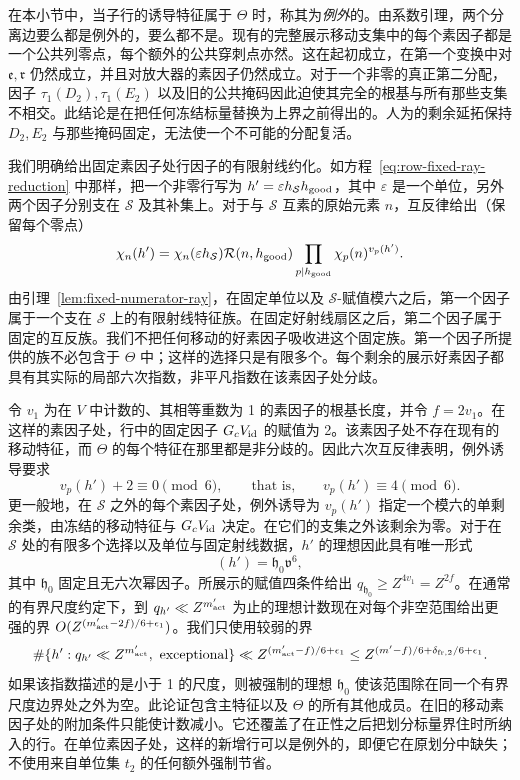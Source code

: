 在本小节中，当子行的诱导特征属于 \(\Theta\) 时，称其为\emph{例外}的。由系数引理，两个分离边要么都是例外的，要么都不是。现有的完整展示移动支集中的每个素因子都是一个公共列零点，每个额外的公共穿刺点亦然。这在起初成立，在第一个变换中对 \(\mathfrak e,\mathfrak r\) 仍然成立，并且对放大器的素因子仍然成立。对于一个非零的真正第二分配，因子 \(\tau_1(D_2),\tau_1(E_2)\) 以及旧的公共掩码因此迫使其完全的根基与所有那些支集不相交。此结论是在把任何冻结标量替换为上界之前得出的。人为的剩余延拓保持 \(D_2,E_2\) 与那些掩码固定，无法使一个不可能的分配复活。

我们明确给出固定素因子处行因子的有限射线约化。如方程~\eqref{eq:row-fixed-ray-reduction} 中那样，把一个非零行写为 \(h'=\varepsilon h_{\mathcal S}h_{\rm good}\)，其中 \(\varepsilon\) 是一个单位，另外两个因子分别支在 \(\mathcal S\) 及其补集上。对于与 \(\mathcal S\) 互素的原始元素 \(n\)，互反律给出（保留每个零点）
\[
 \chi_n(h')=\chi_n(\varepsilon h_{\mathcal S})
   \mathcal R(n,h_{\rm good})
   \prod_{p\mid h_{\rm good}}\chi_p(n)^{v_p(h')}.
\]
由引理~\ref{lem:fixed-numerator-ray}，在固定单位以及 \(\mathcal S\)-赋值模六之后，第一个因子属于一个支在 \(\mathcal S\) 上的有限射线特征族。在固定好射线扇区之后，第二个因子属于固定的互反族。我们不把任何移动的好素因子吸收进这个固定族。第一个因子所提供的族不必包含于 \(\Theta\) 中；这样的选择只是有限多个。每个剩余的展示好素因子都具有其实际的局部六次指数，非平凡指数在该素因子处分歧。

令 \(v_1\) 为在 \(V\) 中计数的、其相等重数为 1 的素因子的根基长度，并令 \(f=2v_1\)。在这样的素因子处，行中的固定因子 \(G_cV_{\rm id}\) 的赋值为 2。该素因子处不存在现有的移动特征，而 \(\Theta\) 的每个特征在那里都是非分歧的。因此六次互反律表明，例外诱导要求
\[
 v_p(h')+2\equiv0\pmod6,\qquad\text{that is,}\qquad
 v_p(h')\equiv4\pmod6.
\]
更一般地，在 \(\mathcal S\) 之外的每个素因子处，例外诱导为 \(v_p(h')\) 指定一个模六的单剩余类，由冻结的移动特征与 \(G_cV_{\rm id}\) 决定。在它们的支集之外该剩余为零。对于在 \(\mathcal S\) 处的有限多个选择以及单位与固定射线数据，\(h'\) 的理想因此具有唯一形式
\[
 (h')=\mathfrak h_0\mathfrak v^6,
\]
其中 \(\mathfrak h_0\) 固定且无六次幂因子。所展示的赋值四条件给出 \(q_{\mathfrak h_0}\ge Z^{4v_1}=Z^{2f}\)。在通常的有界尺度约定下，到 \(q_{h'}\ll Z^{m'_{\rm act}}\) 为止的理想计数现在对每个非空范围给出更强的界 \(O(Z^{(m'_{\rm act}-2f)/6+\epsilon_1})\)。我们只使用较弱的界
\begin{equation}
 \#\{h':q_{h'}\ll Z^{m'_{\rm act}},\ \text{exceptional}\}
 \ll Z^{(m'_{\rm act}-f)/6+\epsilon_1}
 \le Z^{(m'-f)/6+\delta_{{\rm fr},2}/6+\epsilon_1}.
 \label{eq:exceptional-row-count}
\end{equation}
如果该指数描述的是小于 1 的尺度，则被强制的理想 \(\mathfrak h_0\) 使该范围除在同一个有界尺度边界处之外为空。此论证包含主特征以及 \(\Theta\) 的所有其他成员。在旧的移动素因子处的附加条件只能使计数减小。它还覆盖了在正性之后把划分标量界住时所纳入的行。在单位素因子处，这样的新增行可以是例外的，即便它在原划分中缺失；不使用来自单位集 \(t_2\) 的任何额外强制节省。

